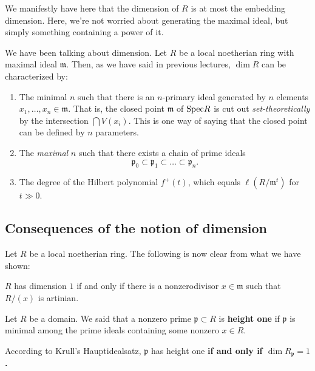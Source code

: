\begin{remark} 
We manifestly have here that the dimension of $R$ is at most the embedding
dimension. Here, we're not worried about generating the maximal ideal, but
simply something containing a power of it.
\end{remark} 

We have been talking about dimension. Let $R$ be a local noetherian ring with
maximal ideal $\mathfrak{m}$. Then, as we have said in previous lectures, $\dim R$ can be characterized by:
\begin{enumerate}
\item The minimal $n$ such that there is an $n$-primary ideal generated by $n$
elements $x_1, \dots, x_n \in \mathfrak{m}$. That is, the closed point
$\mathfrak{m}$ of
$\mathrm{Spec} R$ is cut out \emph{set-theoretically} by the intersection $\bigcap
V(x_i)$. This is one way of saying that the closed point can be defined by $n$
parameters. 
\item The \emph{maximal} $n$ such that there exists a chain of prime ideals
\[ \mathfrak{p}_0 \subset \mathfrak{p}_1 \subset \dots \subset \mathfrak{p}_n. \]
\item The degree of the Hilbert polynomial $f^+(t)$, which equals
$\ell(R/\mathfrak{m}^t)$ for $t \gg 0$.
\end{enumerate}


\subsection{Consequences of the notion of dimension}


Let $R$ be a local noetherian ring.
The following is now clear from what we have shown:

\begin{theorem}
$R$ has dimension $1$ if and only if there is a nonzerodivisor $x \in \mathfrak{m}$ such that
$R/(x)$ is artinian.
\end{theorem} 



\begin{remark} 
Let $R$ be a domain. We said that a nonzero prime $\mathfrak{p} \subset R$ is
\textbf{height one} if $\mathfrak{p}$ is minimal among the prime ideals
containing some nonzero $x \in R$. 

According to Krull's Hauptidealsatz, $\mathfrak{p}$ has height one \textbf{if
and only if $\dim R_{\mathfrak{p}} = 1$.}
\end{remark} 



